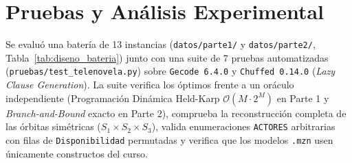 \section{Pruebas y Análisis Experimental}
\label{sec:pruebas}

Se evaluó una batería de 13 instancias (\nolinkurl{datos/parte1/} y \nolinkurl{datos/parte2/}, Tabla~\ref{tab:diseno_bateria}) junto con una suite de 7 pruebas automatizadas (\nolinkurl{pruebas/test_telenovela.py}) sobre \texttt{Gecode 6.4.0} y \texttt{Chuffed 0.14.0} (\emph{Lazy Clause Generation}). La suite verifica los óptimos frente a un oráculo independiente (Programación Dinámica Held-Karp $\mathcal{O}(M \cdot 2^M)$ en Parte 1 y \emph{Branch-and-Bound} exacto en Parte 2), comprueba la reconstrucción completa de las órbitas simétricas ($S_1 \times S_2 \times S_3$), valida enumeraciones \texttt{ACTORES} arbitrarias con filas de \texttt{Disponibilidad} permutadas y verifica que los modelos \texttt{.mzn} usen únicamente constructos del curso.

